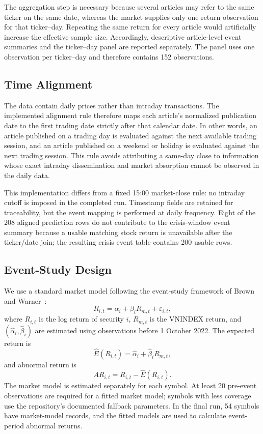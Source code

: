 The aggregation step is necessary because several articles may refer to the same ticker on the same date, whereas the market supplies only one return observation for that ticker--day. Repeating the same return for every article would artificially increase the effective sample size. Accordingly, descriptive article-level event summaries and the ticker--day panel are reported separately. The panel uses one observation per ticker--day and therefore contains 152 observations.

\subsection{Time Alignment}
\label{subsec:time-alignment}

The data contain daily prices rather than intraday transactions. The implemented alignment rule therefore maps each article's normalized publication date to the first trading date strictly after that calendar date. In other words, an article published on a trading day is evaluated against the next available trading session, and an article published on a weekend or holiday is evaluated against the next trading session. This rule avoids attributing a same-day close to information whose exact intraday dissemination and market absorption cannot be observed in the daily data.

This implementation differs from a fixed 15:00 market-close rule: no intraday cutoff is imposed in the completed run. Timestamp fields are retained for traceability, but the event mapping is performed at daily frequency. Eight of the 208 aligned prediction rows do not contribute to the crisis-window event summary because a usable matching stock return is unavailable after the ticker/date join; the resulting crisis event table contains 200 usable rows.

\subsection{Event-Study Design}
\label{subsec:event-study}

We use a standard market model following the event-study framework of Brown and Warner~\cite{brownwarner1985}:
\[
 R_{i,t}=\alpha_i+\beta_iR_{m,t}+\varepsilon_{i,t},
\]
where $R_{i,t}$ is the log return of security $i$, $R_{m,t}$ is the VNINDEX return, and $(\hat{\alpha}_i,\hat{\beta}_i)$ are estimated using observations before 1 October 2022. The expected return is
\[
 \widehat{E}(R_{i,t})=\hat{\alpha}_i+\hat{\beta}_iR_{m,t},
\]
and abnormal return is
\[
 AR_{i,t}=R_{i,t}-\widehat{E}(R_{i,t}).
\]
The market model is estimated separately for each symbol. At least 20 pre-event observations are required for a fitted market model; symbols with less coverage use the repository's documented fallback parameters. In the final run, 54 symbols have market-model records, and the fitted models are used to calculate event-period abnormal returns.

